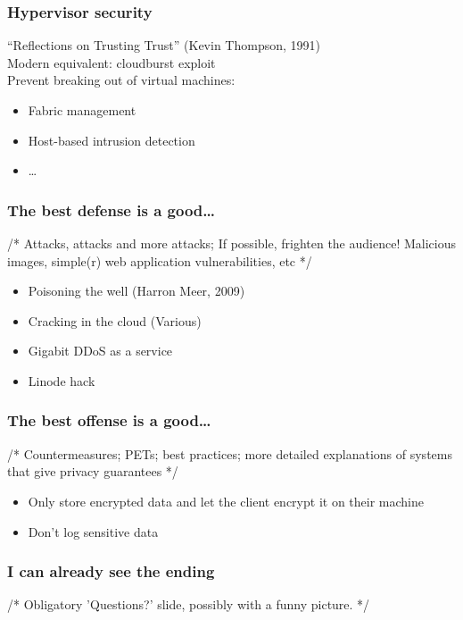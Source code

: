 \documentclass{beamer}
\begin{document}
\begin{frame}
    \frametitle{Hypervisor security}
    ``Reflections on Trusting Trust'' (Kevin Thompson, 1991) \\
    Modern equivalent: cloudburst exploit \\
    Prevent breaking out of virtual machines:
    \begin{itemize}
      \item Fabric management
      \item Host-based intrusion detection
      \item \dots
    \end{itemize}
\end{frame}

\begin{frame}
    \frametitle{The best defense is a good\dots}
    /* Attacks, attacks and more attacks; If possible, frighten the audience!
    Malicious images, simple(r) web application vulnerabilities, etc */
    \begin{itemize}
      \item Poisoning the well (Harron Meer, 2009)
      \item Cracking in the cloud (Various) %
      \item Gigabit DDoS as a service %
      \item Linode hack
    \end{itemize}
\end{frame}

\begin{frame}
    \frametitle{The best offense is a good\dots}
    /* Countermeasures; PETs; best practices; more detailed explanations of
    systems that give privacy guarantees */
    \begin{itemize}
      \item Only store encrypted data and let the client encrypt it on their machine
      \item Don't log sensitive data
    \end{itemize}
\end{frame}

\begin{frame}
    \frametitle{I can already see the ending}
    /* Obligatory 'Questions?' slide, possibly with a funny picture. */
\end{frame}
\end{document}
